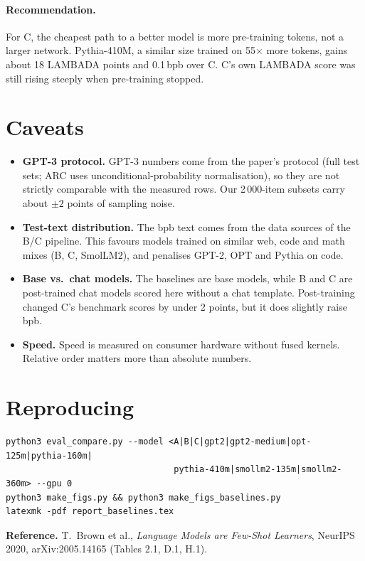 \documentclass[10pt,a4paper]{article}
\begin{document}
\paragraph{Recommendation.}
For C, the cheapest path to a better model is more pre-training tokens, not a larger network. Pythia-410M, a similar size trained on 55$\times$ more tokens, gains about 18 LAMBADA points and 0.1\,bpb over C. C's own LAMBADA score was still rising steeply when pre-training stopped.

\section{Caveats}
\begin{itemize}
  \item \textbf{GPT-3 protocol.} GPT-3 numbers come from the paper's protocol (full test sets; ARC uses unconditional-probability normalisation), so they are not strictly comparable with the measured rows. Our 2\,000-item subsets carry about $\pm2$ points of sampling noise.
  \item \textbf{Test-text distribution.} The bpb text comes from the data sources of the B/C pipeline. This favours models trained on similar web, code and math mixes (B, C, SmolLM2), and penalises GPT-2, OPT and Pythia on code.
  \item \textbf{Base vs.\ chat models.} The baselines are base models, while B and C are post-trained chat models scored here without a chat template. Post-training changed C's benchmark scores by under 2 points, but it does slightly raise bpb.
  \item \textbf{Speed.} Speed is measured on consumer hardware without fused kernels. Relative order matters more than absolute numbers.
\end{itemize}

\section*{Reproducing}
\begin{verbatim}
python3 eval_compare.py --model <A|B|C|gpt2|gpt2-medium|opt-125m|pythia-160m|
                                 pythia-410m|smollm2-135m|smollm2-360m> --gpu 0
python3 make_figs.py && python3 make_figs_baselines.py
latexmk -pdf report_baselines.tex
\end{verbatim}
\noindent\textbf{Reference.} T.~Brown et al., \emph{Language Models are Few-Shot Learners}, NeurIPS 2020, arXiv:2005.14165 (Tables 2.1, D.1, H.1).
\end{document}
